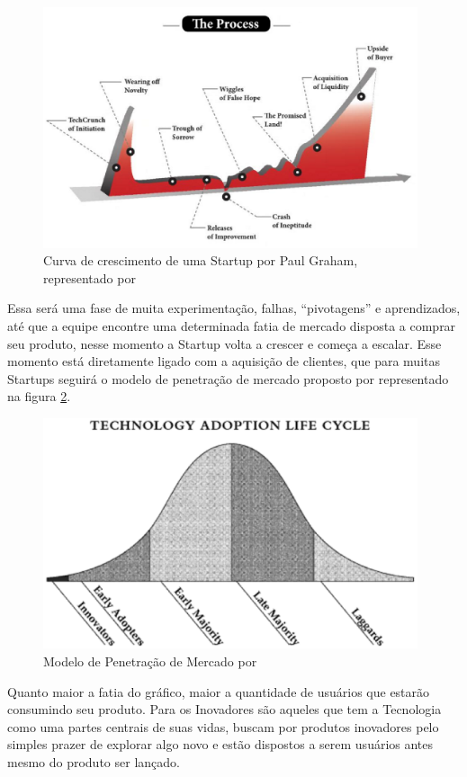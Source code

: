\begin{figure}[!htb]
\centering
\includegraphics[width=11cm,angle=0]{figuras/startup_curve_by_graham}
\caption{Curva de crescimento de uma Startup por Paul Graham, representado por \cite{Polgar2015}}
\label{figure:startup_curve_by_graham}
\end{figure}

Essa será uma fase de muita experimentação, falhas, ``pivotagens'' e aprendizados, até que a equipe encontre uma determinada fatia de mercado disposta a comprar seu produto, nesse momento a Startup volta a crescer e começa a escalar. Esse momento está diretamente ligado com a aquisição de clientes, que para muitas Startups seguirá o modelo de penetração de mercado proposto por  representado na figura \ref{figure:chasm_curve}.

\begin{figure}[!htb]
\centering
\includegraphics[width=11cm,angle=0]{figuras/chasm_curve}
\caption{Modelo de Penetração de Mercado por \cite{Moore2014}}
\label{figure:chasm_curve}
\end{figure}

Quanto maior a fatia do gráfico, maior a quantidade de usuários que estarão consumindo seu produto. Para  os Inovadores são aqueles que tem a Tecnologia como uma partes centrais de suas vidas, buscam por produtos inovadores pelo simples prazer de explorar algo novo e estão dispostos a serem usuários antes mesmo do produto ser lançado. 

